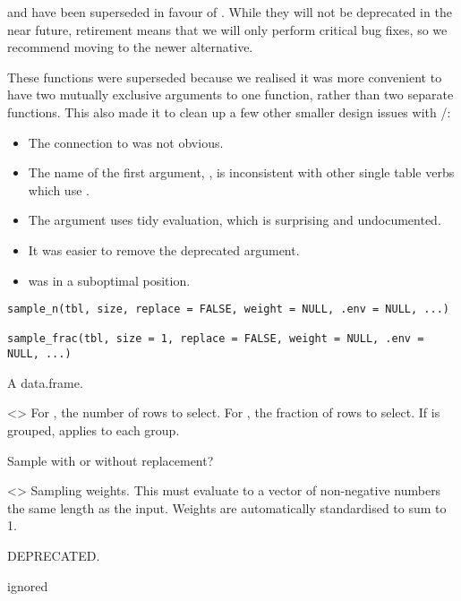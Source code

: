 \documentclass[a4paper]{book}
\begin{document}
%
\begin{Description}
\strong{[Superseded]}
 and  have been superseded in favour of
. While they will not be deprecated in the near future,
retirement means that we will only perform critical bug fixes, so we recommend
moving to the newer alternative.

These functions were superseded because we realised it was more convenient to
have two mutually exclusive arguments to one function, rather than two
separate functions. This also made it to clean up a few other smaller
design issues with /:
\begin{itemize}

\item{} The connection to  was not obvious.
\item{} The name of the first argument, , is inconsistent with other
single table verbs which use .
\item{} The  argument uses tidy evaluation, which is surprising and
undocumented.
\item{} It was easier to remove the deprecated  argument.
\item{}  was in a suboptimal position.

\end{itemize}

\end{Description}
%
\begin{Usage}
\begin{verbatim}
sample_n(tbl, size, replace = FALSE, weight = NULL, .env = NULL, ...)

sample_frac(tbl, size = 1, replace = FALSE, weight = NULL, .env = NULL, ...)
\end{verbatim}
\end{Usage}
%
\begin{Arguments}
\begin{ldescription}
\item[\code{tbl}] A data.frame.

\item[\code{size}] <>
For , the number of rows to select.
For , the fraction of rows to select.
If  is grouped,  applies to each group.

\item[\code{replace}] Sample with or without replacement?

\item[\code{weight}] <> Sampling weights.
This must evaluate to a vector of non-negative numbers the same length as
the input. Weights are automatically standardised to sum to 1.

\item[\code{.env}] DEPRECATED.

\item[\code{...}] ignored
\end{ldescription}
\end{Arguments}
\end{document}
